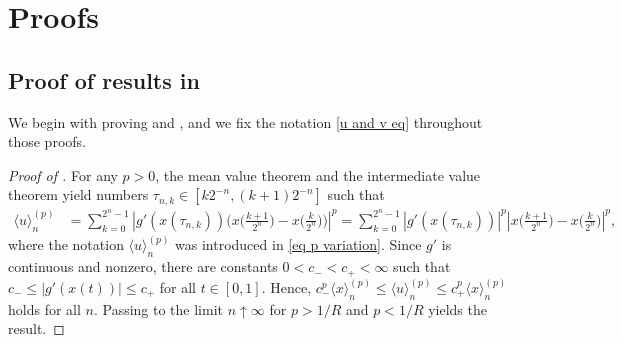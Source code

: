 \documentclass[12pt,reqno]{article}
\def\ua{\uparrow}
\def\wh{\widehat}
\numberwithin{equation}{section}
\def\cR{{\mathscr R}}
\theoremstyle{definition}
\def\<{\langle}
\def\>{\rangle}
\def\ua{\uparrow}
\def\wh{\widehat}
\begin{document}





\section{Proofs}\label{Section Proof}
\subsection{Proof of results in }

We begin with proving  and , and we fix the notation \eqref{u and v eq} throughout those proofs.


\begin{proof}[Proof of ]	For any $p > 0$, the mean value theorem and the intermediate value theorem yield numbers $\tau_{n,k} \in [k2^{-n},(k+1)2^{-n}]$ such that 
	\begin{equation}\label{eq varitaion u}
		\begin{split}
			\<u\>^{(p)}_n& =    \sum_{k = 0}^{2^n-1}\left|g'(x(\tau_{n,k}))\Big(x\Big(\frac{k+1}{2^n}\Big)-x\Big(\frac{k}{2^n}\Big)\Big)\right|^p	 = \sum_{k = 0}^{2^n-1}\left|g'(x(\tau_{n,k}))\right|^p\left|x\Big(\frac{k+1}{2^n}\Big)-x\Big(\frac{k}{2^n}\Big)\right|^p,
		\end{split}
	\end{equation}
	where  the notation $\<u\>^{(p)}_n$ was introduced in \eqref{eq p variation}.
	Since $g'$ is continuous and nonzero, there are constants $0<c_-<c_+<\infty$ such that $c_-\le|g'(x(t))|\le c_+$ for all $t\in[0,1]$. Hence, $c_-^p	 \<x\>^{(p)}_n\le  \<u\>^{(p)}_n\le c_+^p \<x\>^{(p)}_n$ holds for all $n$. Passing to the limit $n\ua\infty$ for $p>1/{R}$ and $p<1/{R}$ yields the result.
\end{proof}
\end{document}
